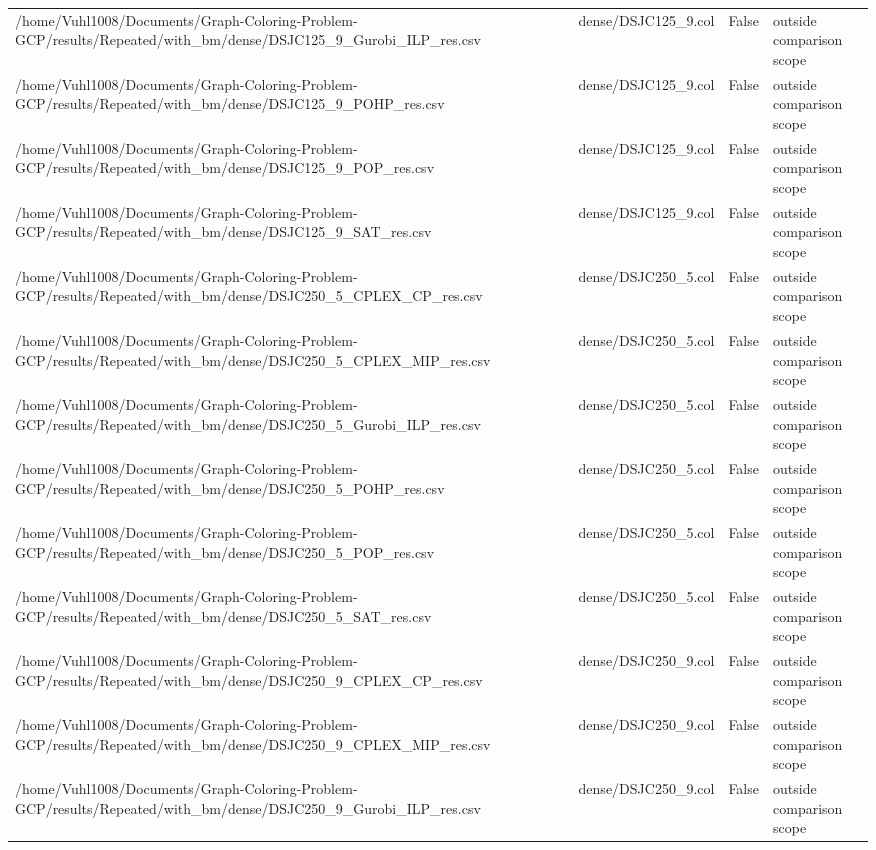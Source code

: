\begin{table}[htbp]
\begin{tabular}{llll}
/home/Vuhl1008/Documents/Graph-Coloring-Problem-GCP/results/Repeated/with\_bm/dense/DSJC125\_9\_Gurobi\_ILP\_res.csv & dense/DSJC125\_9.col & False & outside comparison scope \\
/home/Vuhl1008/Documents/Graph-Coloring-Problem-GCP/results/Repeated/with\_bm/dense/DSJC125\_9\_POHP\_res.csv & dense/DSJC125\_9.col & False & outside comparison scope \\
/home/Vuhl1008/Documents/Graph-Coloring-Problem-GCP/results/Repeated/with\_bm/dense/DSJC125\_9\_POP\_res.csv & dense/DSJC125\_9.col & False & outside comparison scope \\
/home/Vuhl1008/Documents/Graph-Coloring-Problem-GCP/results/Repeated/with\_bm/dense/DSJC125\_9\_SAT\_res.csv & dense/DSJC125\_9.col & False & outside comparison scope \\
/home/Vuhl1008/Documents/Graph-Coloring-Problem-GCP/results/Repeated/with\_bm/dense/DSJC250\_5\_CPLEX\_CP\_res.csv & dense/DSJC250\_5.col & False & outside comparison scope \\
/home/Vuhl1008/Documents/Graph-Coloring-Problem-GCP/results/Repeated/with\_bm/dense/DSJC250\_5\_CPLEX\_MIP\_res.csv & dense/DSJC250\_5.col & False & outside comparison scope \\
/home/Vuhl1008/Documents/Graph-Coloring-Problem-GCP/results/Repeated/with\_bm/dense/DSJC250\_5\_Gurobi\_ILP\_res.csv & dense/DSJC250\_5.col & False & outside comparison scope \\
/home/Vuhl1008/Documents/Graph-Coloring-Problem-GCP/results/Repeated/with\_bm/dense/DSJC250\_5\_POHP\_res.csv & dense/DSJC250\_5.col & False & outside comparison scope \\
/home/Vuhl1008/Documents/Graph-Coloring-Problem-GCP/results/Repeated/with\_bm/dense/DSJC250\_5\_POP\_res.csv & dense/DSJC250\_5.col & False & outside comparison scope \\
/home/Vuhl1008/Documents/Graph-Coloring-Problem-GCP/results/Repeated/with\_bm/dense/DSJC250\_5\_SAT\_res.csv & dense/DSJC250\_5.col & False & outside comparison scope \\
/home/Vuhl1008/Documents/Graph-Coloring-Problem-GCP/results/Repeated/with\_bm/dense/DSJC250\_9\_CPLEX\_CP\_res.csv & dense/DSJC250\_9.col & False & outside comparison scope \\
/home/Vuhl1008/Documents/Graph-Coloring-Problem-GCP/results/Repeated/with\_bm/dense/DSJC250\_9\_CPLEX\_MIP\_res.csv & dense/DSJC250\_9.col & False & outside comparison scope \\
/home/Vuhl1008/Documents/Graph-Coloring-Problem-GCP/results/Repeated/with\_bm/dense/DSJC250\_9\_Gurobi\_ILP\_res.csv & dense/DSJC250\_9.col & False & outside comparison scope \\

\end{tabular}
\end{table}
